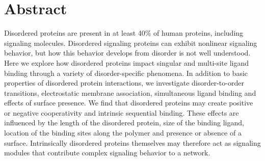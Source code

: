 \documentclass[../AdvancementSummary.tex]{subfiles}
\begin{document}
\section{Abstract}

Disordered proteins are present in at least 40\% of human proteins, including signaling molecules. Disordered signaling proteins can exhibit nonlinear signaling behavior, but how this behavior develops from disorder is not well understood. Here we explore how disordered proteins impact singular and multi-site ligand binding through a variety of disorder-specific phenomena. In addition to basic properties of disordered protein interactions, we investigate disorder-to-order transitions, electrostatic membrane association, simultaneous ligand binding and effects of surface presence. We find that disordered proteins may create positive or negative cooperativity and intrinsic sequential binding. These effects are influenced by the length of the disordered protein, size of the binding ligand, location of the binding sites along the polymer and presence or absence of a surface. Intrinsically disordered proteins themselves may therefore act as signaling modules that contribute complex signaling behavior to a network.
\end{document}
